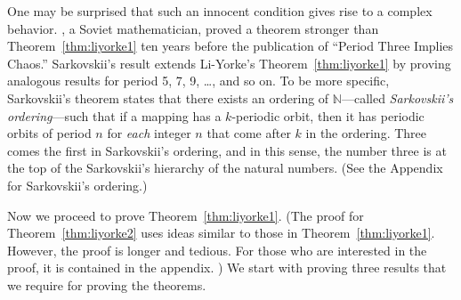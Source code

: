 \documentclass[10pt,draft,twoside]{book}
\begin{document}
One may be surprised that such an innocent condition gives rise to a complex behavior.
\citet{sarkovskii}, a Soviet mathematician, proved a theorem stronger than Theorem~\ref{thm:liyorke1} ten years before the publication of ``Period Three Implies Chaos.''
Sarkovskii's result extends Li-Yorke's Theorem~\ref{thm:liyorke1} by proving analogous results for period 5, 7, 9, \ldots, and so on.
To be more specific, Sarkovskii's theorem states that there exists an ordering of $\mathbb{N}$---called \textit{Sarkovskii's ordering}---such that if a mapping has a $k$-periodic orbit, then it has periodic orbits of period $n$ for \textit{each} integer $n$ that come after $k$ in the ordering.
Three comes the first in Sarkovskii's ordering, and in this sense, the number three is at the top of the Sarkovskii's hierarchy of the natural numbers.
(See the Appendix for Sarkovskii's ordering.)

Now we proceed to prove Theorem~\ref{thm:liyorke1}. 
(The proof for Theorem~\ref{thm:liyorke2} uses ideas similar to those in Theorem~\ref{thm:liyorke1}.
However, the proof is longer and tedious.
For those who are interested in the proof, it is contained in the appendix.
)
We start with proving three results that we require for proving the theorems.
\end{document}
